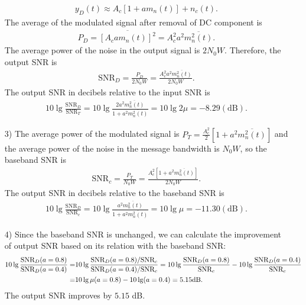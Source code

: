 \documentclass{assignment}
\begin{document}
\begin{sol}
\begin{itemize}
        \begin{align}
            y_D(t)\approx A_c[1+am_n(t)]+n_c(t).
        \end{align}
        The average of the modulated signal after removal of DC component is
        \begin{align}
            P_D=\overline{[A_cam_n(t)]^2}=A_c^2a^2\overline{m_n^2(t)}.
        \end{align}
        The average power of the noise in the output signal is $2N_0W$. Therefore, the output SNR is
        \begin{align}
            \text{SNR}_D=\frac{P_D}{2N_0W}=\frac{A_c^2a^2\overline{m_n^2(t)}}{2N_0W}.
        \end{align}
        The output SNR in decibels relative to the input SNR is
        \begin{align}
            10\lg\frac{\text{SNR}_D}{\text{SNR}_T}=10\lg\frac{2a^2\overline{m_n^2(t)}}{1+a^2\overline{m_n^2(t)}}=10\lg 2\mu=-8.29(\mathrm{dB}).
        \end{align}
        \item[3)] The average power of the modulated signal is $P_T=\frac{A_c^2}{2}[1+a^2\overline{m_n^2(t)}]$ and the average power of the noise in the message bandwidth is $N_0W$, so the baseband SNR is
        \begin{align}
            \text{SNR}_c=\frac{P_T}{N_0W}=\frac{A_c^2[1+a^2\overline{m_n^2(t)}]}{2N_0W}.
        \end{align}
        The output SNR in decibels relative to the baseband SNR is
        \begin{align}
            10\lg\frac{\text{SNR}_D}{\text{SNR}_c}=10\lg\frac{a^2\overline{m_n^2(t)}}{1+a^2\overline{m_n^2(t)}}=10\lg\mu=-11.30(\mathrm{dB}).
        \end{align}
        \item[4)] Since the baseband SNR is unchanged, we can calculate the improvement of output SNR based on its relation with the baseband SNR:
        \begin{align}
            \notag 10\lg\frac{\text{SNR}_D(a=0.8)}{\text{SNR}_D(a=0.4)}=&10\lg\frac{\text{SNR}_D(a=0.8)/\text{SNR}_c}{\text{SNR}_D(a=0.4)/\text{SNR}_c}=10\lg\frac{\text{SNR}_D(a=0.8)}{\text{SNR}_c}-10\lg\frac{\text{SNR}_D(a=0.4)}{\text{SNR}_c}\\
            =&10\lg\mu(a=0.8)-10\lg(a=0.4)=5.15\mathrm{dB}.
        \end{align}
        The output SNR improves by $5.15$ dB.
    \end{itemize}
\end{sol}
\end{document}
